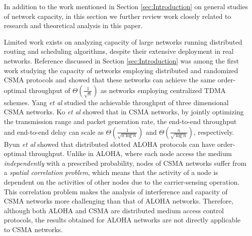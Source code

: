 \documentclass[english]{IEEEtran}
\theoremstyle{plain}
\theoremstyle{plain}
\theoremstyle{plain}
\theoremstyle{remark}
\begin{document}
In addition to the work mentioned in Section \ref{sec:Introduction}
on general studies of network capacity, in this section we further
review work closely related to research and theoretical analysis in
this paper.

Limited work exists on analyzing capacity of large networks running
distributed routing and scheduling algorithms, despite their extensive
deployment in real networks. Reference \cite{Chau11Capacity} discussed
in Section \ref{sec:Introduction} was among the first work studying
the capacity of networks employing distributed and randomized CSMA
protocols and showed that these networks can achieve the same order-optimal
throughput of $\Theta\left(\frac{1}{\sqrt{n}}\right)$ as networks
employing centralized TDMA schemes. Yang \emph{et al} \cite{Yang12Capacity}
studied the achievable throughput of three dimensional CSMA networks.
Ko \emph{et al} \cite{Ko13Optimization} showed that in CSMA networks,
by jointly optimizing the transmission range and packet generation
rate, the end-to-end throughput and end-to-end delay can scale as
$\Theta\left(\frac{1}{\sqrt{n\log n}}\right)$ and $\Theta\left(\frac{n}{\sqrt{\log n}}\right)$,
respectively. Byun \emph{et al} \cite{Byun13Delay} showed that distributed
slotted ALOHA protocols can have order-optimal throughput. Unlike
in ALOHA, where each node access the medium \emph{independently} with
a prescribed probability, nodes of CSMA networks suffer from a\emph{
spatial correlation problem}, which means that the activity of a node
is dependent on the activities of other nodes due to the carrier-sensing
operation. This correlation problem makes the analysis of interference
and capacity of CSMA networks more challenging than that of ALOHA
networks. Therefore, although both ALOHA and CSMA are distributed
medium access control protocols, the results obtained for ALOHA networks
are not directly applicable to CSMA networks.
\end{document}
